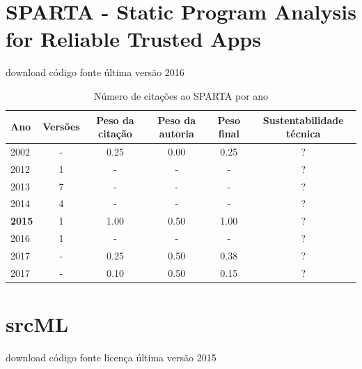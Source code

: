 \section{SPARTA - Static Program Analysis for Reliable Trusted Apps}
\checkmark download
\checkmark código fonte
\checkmark última versão 2016



\begin{table}[H]
\caption{Número de citações ao SPARTA  por ano}
\centering
\begin{tabular}{| l | c | c | c | c | c |}
  \hline
  Ano & Versões & Peso da citação & Peso da autoria & Peso final & Sustentabilidade técnica \\
  \hline
            2002
          &
          -
          &
          0.25
          &
          0.00
          &
            {\color{red} 0.25}
          &
          ?
          \\
\hline
        2012 & 1 & - & - & - & ? \\
\hline
        2013 & 7 & - & - & - & ? \\
\hline
        2014 & 4 & - & - & - & ? \\
\hline
            {\bf 2015}
          &
          1
          &
          1.00
          &
          0.50
          &
            {\color{blue} 1.00}
          &
          ?
          \\
\hline
        2016 & 1 & - & - & - & ? \\
\hline
            2017
          &
          -
          &
          0.25
          &
          0.50
          &
            {\color{red} 0.38}
          &
          ?
          \\
            2017
          &
          -
          &
          0.10
          &
          0.50
          &
            {\color{red} 0.15}
          &
          ?
          \\
\hline
\end{tabular}
\end{table}



\section{srcML}
\checkmark download
\checkmark código fonte
\checkmark licença
\checkmark última versão 2015



